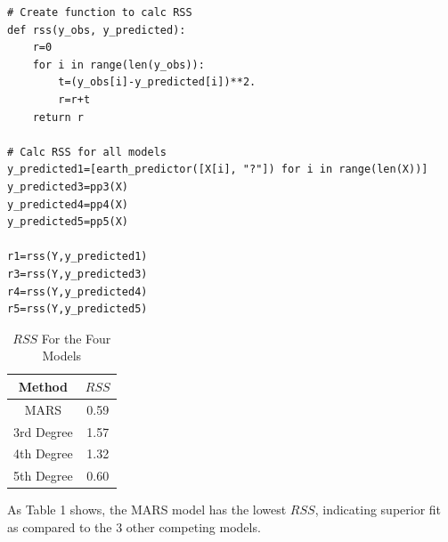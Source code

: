 \begin{lstlisting}[caption={Calculate the $RSS$ for the Four Models  },label=lst:expected_times,firstnumber=63]
# Create function to calc RSS
def rss(y_obs, y_predicted):
    r=0
    for i in range(len(y_obs)):
        t=(y_obs[i]-y_predicted[i])**2.
        r=r+t
    return r

# Calc RSS for all models
y_predicted1=[earth_predictor([X[i], "?"]) for i in range(len(X))]
y_predicted3=pp3(X)
y_predicted4=pp4(X)
y_predicted5=pp5(X)

r1=rss(Y,y_predicted1)
r3=rss(Y,y_predicted3)
r4=rss(Y,y_predicted4)
r5=rss(Y,y_predicted5)
\end{lstlisting}

\begin{table}[H]
\caption{$RSS$ For the Four Models}
\centering
\begin{tabular}{c c}
\hline\hline
Method & $RSS$ \\
\hline
MARS & 0.59 \\
3rd Degree & 1.57 \\
4th Degree & 1.32 \\
5th Degree & 0.60 \\
\hline
\end{tabular}
\label{table:nonlin} 
\end{table}

As Table 1 shows, the MARS model has the lowest $RSS$, indicating superior fit as compared to the 3 other competing models.
